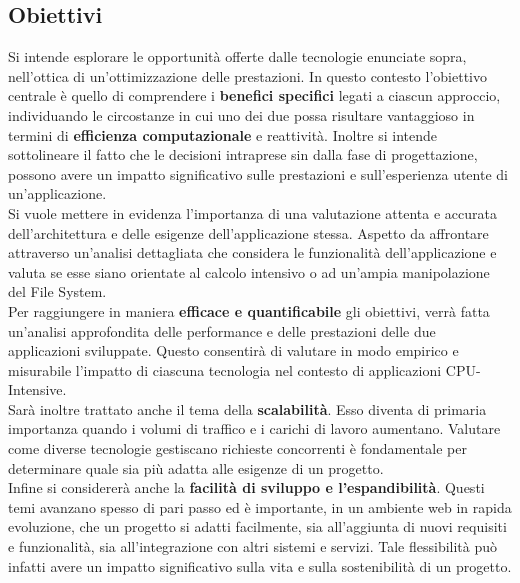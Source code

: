 \subsection{Obiettivi}
Si intende esplorare le opportunità offerte dalle tecnologie enunciate sopra, nell'ottica di un'ottimizzazione delle prestazioni.
In questo contesto l'obiettivo centrale è quello di comprendere i \textbf{benefici specifici} legati a ciascun approccio, individuando le circostanze in cui uno dei due possa risultare vantaggioso in termini di \textbf{efficienza computazionale} e reattività. 
Inoltre si intende sottolineare il fatto che le decisioni intraprese sin dalla fase di progettazione, possono avere un impatto significativo sulle prestazioni e sull'esperienza utente di un'applicazione.
\\Si vuole mettere in evidenza l'importanza di una valutazione attenta e accurata dell'architettura e delle esigenze dell'applicazione stessa.
Aspetto da affrontare attraverso un'analisi dettagliata che considera le funzionalità dell'applicazione e valuta se esse siano orientate al calcolo intensivo o ad un'ampia manipolazione del File System.
\\Per raggiungere in maniera \textbf{efficace e quantificabile} gli obiettivi, verrà fatta un'analisi approfondita delle performance e delle prestazioni delle due applicazioni sviluppate.
Questo consentirà di valutare in modo empirico e misurabile l'impatto di ciascuna tecnologia nel contesto di applicazioni CPU-Intensive.
\\Sarà inoltre trattato anche il tema della \textbf{scalabilità}. Esso diventa di primaria importanza quando i volumi di traffico e i carichi di lavoro aumentano. Valutare come diverse tecnologie gestiscano richieste concorrenti è fondamentale per determinare quale sia più adatta alle esigenze di un progetto.
\\Infine si considererà anche la \textbf{facilità di sviluppo e l'espandibilità}. 
Questi temi avanzano spesso di pari passo ed è importante, in un ambiente web in rapida evoluzione, che un progetto si adatti facilmente, sia all'aggiunta di nuovi requisiti e funzionalità, sia all'integrazione con altri sistemi e servizi. Tale flessibilità può infatti avere un impatto significativo sulla vita e sulla sostenibilità di un progetto.


\newpage

